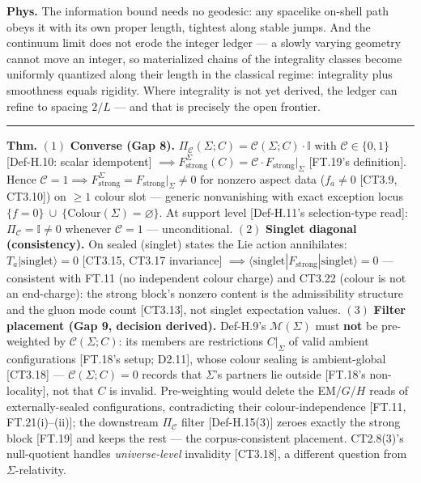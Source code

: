 \begin{theorem}
\textbf{Phys.} The information bound needs no geodesic: any spacelike on-shell path obeys it with its own proper length, tightest along stable jumps. And the continuum limit does not erode the integer ledger — a slowly varying geometry cannot move an integer, so materialized chains of the integrality classes become uniformly quantized along their length in the classical regime: integrality plus smoothness equals rigidity. Where integrality is not yet derived, the ledger can refine to spacing $2/L$ — and that is precisely the open frontier.

\vspace{2pt}\noindent\rule{\textwidth}{0.4pt}\vspace{2pt}

\end{theorem}

\begin{theorem}\label{tag:FT-39}
\textbf{Thm.} $(1)$ \textbf{Converse (Gap 8).} $\Pi_{\mathcal C}(\Sigma;C)=\mathcal C(\Sigma;C)\cdot\mathbb I$ with $\mathcal C\in\{0,1\}$ [Def-H.10: scalar idempotent] $\implies F_{\mathrm{strong}}^\Sigma(C)=\mathcal C\cdot F_{\mathrm{strong}}\big|_\Sigma$ [FT.19's definition]. Hence $\mathcal C=1\implies F_{\mathrm{strong}}^\Sigma=F_{\mathrm{strong}}\big|_\Sigma\ne0$ for nonzero aspect data ($f_a\ne0$ [CT3.9, CT3.10]) on $\ge1$ colour slot — generic nonvanishing with exact exception locus $\{f=0\}\ \cup\ \{\mathrm{Colour}(\Sigma)=\varnothing\}$. At support level [Def-H.11's selection-type read]: $\Pi_{\mathcal C}=\mathbb I\ne0$ whenever $\mathcal C=1$ — unconditional. $(2)$ \textbf{Singlet diagonal (consistency).} On sealed (singlet) states the Lie action annihilates: $T_a|\text{singlet}\rangle=0$ [CT3.15, CT3.17 invariance] $\implies\langle\text{singlet}|F_{\mathrm{strong}}|\text{singlet}\rangle=0$ — consistent with FT.11 (no independent colour charge) and CT3.22 (colour is not an end-charge): the strong block's nonzero content is the admissibility structure and the gluon mode count [CT3.13], not singlet expectation values. $(3)$ \textbf{Filter placement (Gap 9, decision derived).} Def-H.9's $\mathcal M(\Sigma)$ must \textbf{not} be pre-weighted by $\mathcal C(\Sigma;C)$: its members are restrictions $C|_\Sigma$ of valid ambient configurations [FT.18's setup; D2.11], whose colour sealing is ambient-global [CT3.18] — $\mathcal C(\Sigma;C)=0$ records that $\Sigma$'s partners lie outside [FT.18's non-locality], not that $C$ is invalid. Pre-weighting would delete the EM/$G$/$H$ reads of externally-sealed configurations, contradicting their colour-independence [FT.11, FT.21(i)–(ii)]; the downstream $\Pi_{\mathcal C}$ filter [Def-H.15(3)] zeroes exactly the strong block [FT.19] and keeps the rest — the corpus-consistent placement. CT2.8(3)'s null-quotient handles \textit{universe-level} invalidity [CT3.18], a different question from $\Sigma$-relativity.


\end{theorem}
